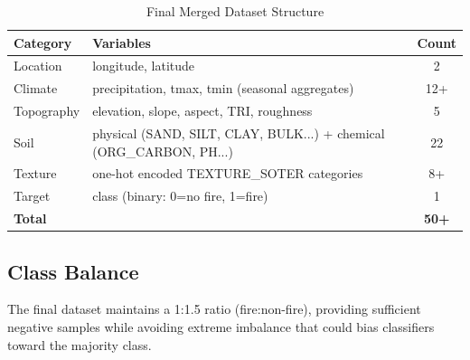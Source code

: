 \begin{table}[H]
\centering
\caption{Final Merged Dataset Structure}
\label{tab:merged_structure}
\begin{tabular}{|l|l|c|}
\hline
\textbf{Category} & \textbf{Variables} & \textbf{Count} \\
\hline
Location & longitude, latitude & 2 \\
Climate & precipitation, tmax, tmin (seasonal aggregates) & 12+ \\
Topography & elevation, slope, aspect, TRI, roughness & 5 \\
Soil & physical (SAND, SILT, CLAY, BULK...) + chemical (ORG\_CARBON, PH...) & 22 \\
Texture & one-hot encoded TEXTURE\_SOTER categories & 8+ \\
Target & class (binary: 0=no fire, 1=fire) & 1 \\
\hline
\textbf{Total} & & \textbf{50+} \\
\hline
\end{tabular}
\end{table}

\subsection{Class Balance}
The final dataset maintains a 1:1.5 ratio (fire:non-fire), providing sufficient negative samples while avoiding extreme imbalance that could bias classifiers toward the majority class.
